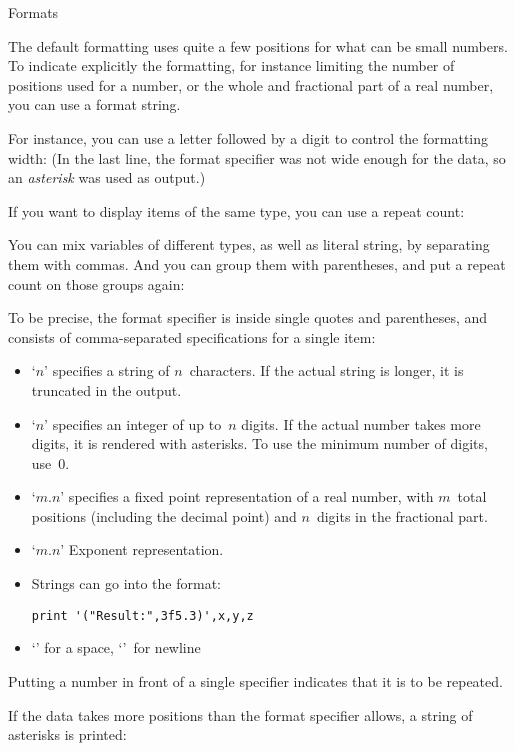  {Formats}

The default formatting uses quite a few positions for what can be
small numbers. To indicate explicitly the formatting, for instance
limiting the number of positions used for a number, or the whole and
fractional part of a real number, you can use a format string.

For instance, you can use a letter followed by a digit to control the
formatting width:
%
%
(In the last line, the format specifier was not wide enough for the
data, so an
\emph{asterisk}
was used as output.)

If you want to display items of the same type, you can use a repeat
count:
%

You can mix variables of different types, as well as literal string,
by separating them with commas. And you can group them with
parentheses, and put a repeat count on those groups again:
%

To be precise, the format specifier is inside single quotes and parentheses, and
consists of comma-separated specifications for a single item:
\begin{itemize}
\item `$n$' specifies a string of $n$~characters. If the actual
  string is longer, it is truncated in the output.
\item `$n$' specifies an integer of up to~$n$ digits. If the actual
  number takes more digits, it is rendered with asterisks.
  To use the minimum number of digits, use~$0$.
\item `$m.n$' specifies a fixed point representation of a real
  number, with $m$~total positions (including the decimal point)
  and $n$~digits in the fractional part.
\item `$m.n$' Exponent representation.
\item Strings can go into the format:
\begin{lstlisting}
print '("Result:",3f5.3)',x,y,z
\end{lstlisting}
\item `' for a space, `\n{/}'~for newline
\end{itemize}
Putting a number in front of a single specifier indicates that it is
to be repeated.

If the data takes more positions than the format specifier allows, a
string of asterisks is printed:
%

